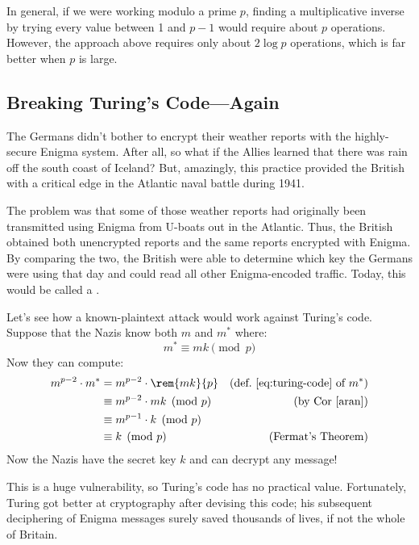 In general, if we were working modulo a prime $p$, finding a
multiplicative inverse by trying every value between 1 and $p - 1$
would require about $p$ operations.  However, the approach above
requires only about  $2 \log p$ operations, which is far
better when $p$ is large.

\subsection{Breaking Turing's Code---Again}

The Germans didn't bother to encrypt their weather reports with the
highly-secure Enigma system.  After all, so what if the Allies learned
that there was rain off the south coast of Iceland?  But, amazingly, this
practice provided the British with a critical edge in the Atlantic naval
battle during 1941.

The problem was that some of those weather reports had originally been
transmitted using Enigma from U-boats out in the Atlantic.  Thus, the
British obtained both unencrypted reports and the same reports
encrypted with Enigma.  By comparing the two, the British were able to
determine which key the Germans were using that day and could read all
other Enigma-encoded traffic.  Today, this would be called a
.

Let's see how a known-plaintext attack would work against Turing's
code.  Suppose that the Nazis know both $m$ and $m^*$ where:
%
\[
m^* \equiv mk \pmod{p}
\]
%
Now they can compute:
%
\begin{align*}
m^{p-2} \cdot m^*
  & = m^{p-2} \cdot \rem{mk}{p}
                & \text{(def.~\eqref{eq:turing-code} of $m^*$)}\\
  & \equiv m^{p-2} \cdot mk \pmod{p} & \text{(by Cor~\ref{aran})}\\
  & \equiv m^{p-1} \cdot k \pmod{p}\\ %
  & \equiv k \pmod{p} & \text{(Fermat's Theorem)}
\end{align*}
%
Now the Nazis have the secret key $k$ and can decrypt any message!

This is a huge vulnerability, so Turing's code has no practical value.
Fortunately, Turing got better at cryptography after devising this
code; his subsequent deciphering of Enigma messages surely saved
thousands of lives, if not the whole of Britain.


